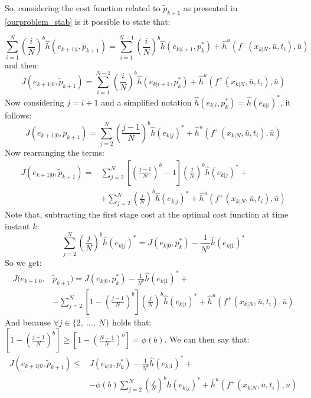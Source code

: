So, considering the cost function related to $\tilde{p}_{k+1}$ as presented in \ref{ourproblem_stab} is it possible to state that:

\begin{equation*}
	\sum_{i=1}^{N}\left(\frac{i}{N}\right)^b \hat{h}({e}_{k+1|i},\tilde{p}_{k+1})=\sum_{i=1}^{N-1}\left(\frac{i}{N}\right)^b \hat{h}({e}_{k|i+1},p^*_{k})+\hat{h}^u\left(f^+(x_{k|N},\bar{u},t_i),\bar{u}\right)
\end{equation*}
and then:
\begin{equation*}
    J({e}_{k+1|0},\tilde{p}_{k+1})=\sum_{i=1}^{N-1}\left(\frac{i}{N}\right)^b \hat{h}({e}_{k|i+1},p^*_{k})+\hat{h}^u\left(f^+(x_{k|N},\bar{u},t_i),\bar{u}\right)
\end{equation*}
Now considering $j=i+1$ and a simplified notation $\hat{h}({e}_{k|i},p_{k}^*)=\hat{h}(e_{k|i})^*$, it follows: 
\begin{equation*}
    J({e}_{k+1|0},\tilde{p}_{k+1})=\sum_{j=2}^{N}\left(\frac{j-1}{N}\right)^b \hat{h}(e_{k|j})^*+\hat{h}^u\left(f^+(x_{k|N},\bar{u},t_i),\bar{u}\right)
\end{equation*}
Now rearranging the terms: 
\begin{equation*}
    \begin{split}
        J({e}_{k+1|0},\tilde{p}_{k+1})=&\sum_{j=2}^{N}\left[\left(\frac{j-1}{N}\right)^b-1\right]\left(\frac{j}{N}\right)^b \hat{h}(e_{k|j})^*+ \\
        &+\sum_{j=2}^{N}\left(\frac{j}{N}\right)^b \hat{h}(e_{k|j})^* + \hat{h}^u\left(f^+(x_{k|N},\bar{u},t_i),\bar{u}\right)
    \end{split}
\end{equation*}
Note that, subtracting the first stage cost at the optimal cost function at time instant $k$:   
\begin{equation*}
	\sum_{j=2}^{N}\left(\frac{j}{N}\right)^b \hat{h}(e_{k|j})^*=J({e}_{k|0},p_{k}^*)-\frac{1}{N^b}\hat{h}(e_{k|1})^*
\end{equation*}
So we get:
\begin{equation*}
    \begin{split}
        J({e}_{k+1|0},&\tilde{p}_{k+1})=J({e}_{k|0},p_{k}^*)-\frac{1}{N^b}\hat{h}(e_{k|1})^*+ \\ 
        &-\sum_{j=2}^{N}\left[1-\left(\frac{j-1}{N}\right)^b\right]\left(\frac{j}{N}\right)^b \hat{h}(e_{k|j})^*+ \hat{h}^u\left(f^+(x_{k|N},\bar{u},t_i),\bar{u}\right)
    \end{split}
\end{equation*}
And because $\forall j \in \lbrace2,\ \dots,\ N\rbrace$ holds that: 
$\left[ 1-\left(\frac{j-1}{N}\right)^b \right]\ge\left[ 1-\left(\frac{N-1}{N}\right)^b \right]= \phi(b)$. We can then say that: 
\begin{equation}\label{dim1}
    \begin{split}
        J({e}_{k+1|0},\tilde{p}_{k+1})\le &J({e}_{k|0},p_{k}^*) - \frac{1}{N^b}\hat{h}(e_{k|1})^*+ \\ 
        &-\phi(b)\sum_{j=2}^{N}\left(\frac{j}{N}\right)^b h(e_{k|j})^*+ \hat{h}^u\left(f^+(x_{k|N},\bar{u},t_i),\bar{u}\right)
    \end{split}
\end{equation}

